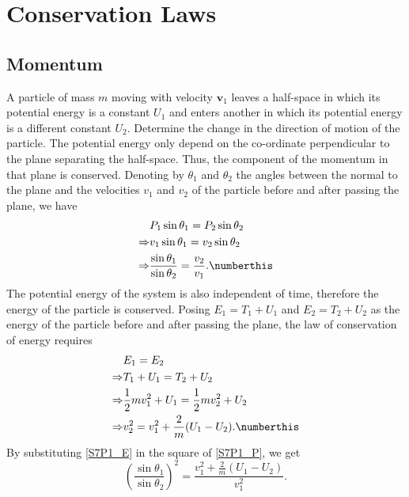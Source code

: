 \chapter{Conservation Laws}

\section{Momentum}


\begin{problem}[title={Refraction of a particle at a potential step}]
{
A particle of mass $m$ moving with velocity $\mathbf{v}_1$ leaves a half-space in which its potential energy is a constant $U_1$ and enters another in which its potential energy is a different constant $U_2$. Determine the change in the direction of motion of the particle.
}
{
The potential energy only depend on the co-ordinate perpendicular to the plane separating the half-space. Thus, the component of the momentum in that plane is conserved. Denoting by $\theta_1$ and $\theta_2$ the angles between the normal to the plane and the velocities $v_1$ and $v_2$ of the particle before and after passing the plane, we have
\begin{align*}
    & P_1 \sin{\theta_1} = P_2 \sin{\theta_2} \\
    \Rightarrow & v_1 \sin{\theta_1} = v_2 \sin{\theta_2} \\
    \Rightarrow & \frac{\sin{\theta_1}}{\sin{\theta_2}} = \frac{v_2}{v_1} . \numberthis \label{S7P1_P}
\end{align*}
The potential energy of the system is also independent of time, therefore the energy of the particle is conserved. Posing $E_1 = T_1 + U_1$ and $E_2 = T_2 + U_2$ as the energy of the particle before and after passing the plane, the law of conservation of energy requires
\begin{align*}
    &E_1 = E_2 \\
    \Rightarrow & T_1 + U_1 = T_2 + U_2 \\
    \Rightarrow &\frac{1}{2} m v_1^2 + U_1 = \frac{1}{2} m v_2^2 + U_2 \\
    \Rightarrow & v_2^2 = v_1^2 + \frac{2}{m}(U_1-U_2). \numberthis \label{S7P1_E}
\end{align*}
By substituting \eqref{S7P1_E} in the square of \eqref{S7P1_P}, we get
\begin{equation*}
    \left( \frac{\sin{\theta_1}}{\sin{\theta_2}} \right)^2 = \frac{v_1^2 + \frac{2}{m}(U_1-U_2)}{v_1^2}.

\end{equation*}}
\end{problem}
